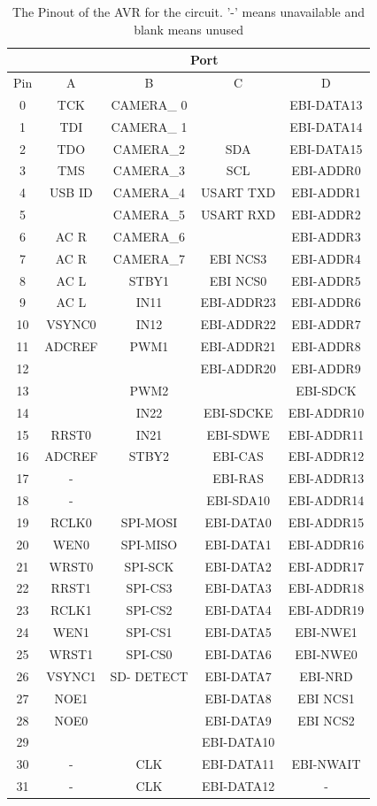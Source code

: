 \begin{table}
\caption{The Pinout of the AVR for the circuit. '-' means unavailable and blank means unused}
\label{table:UC3C:Pinout}
\begin{tabular}{|c|c|c|c|c|}\cline{2-5}
\multicolumn{1}{c|}{ } & \multicolumn{4}{|c|}{Port} \\ \hline
Pin & A & B & C & D \\ \hline
0&TCK&CAMERA\_ 0&&EBI-DATA13\\
1&TDI&CAMERA\_ 1&&EBI-DATA14\\
2&TDO&CAMERA\_2&SDA&EBI-DATA15\\
3&TMS&CAMERA\_3&SCL&EBI-ADDR0\\
4&USB ID&CAMERA\_4&USART TXD&EBI-ADDR1\\
5&&CAMERA\_5&USART RXD&EBI-ADDR2\\
6&AC R&CAMERA\_6&&EBI-ADDR3\\
7&AC R&CAMERA\_7&EBI NCS3&EBI-ADDR4\\
8&AC L&STBY1&EBI NCS0&EBI-ADDR5\\
9&AC L&IN11&EBI-ADDR23&EBI-ADDR6\\
10&VSYNC0&IN12&EBI-ADDR22&EBI-ADDR7\\
11&ADCREF&PWM1&EBI-ADDR21&EBI-ADDR8\\
12&&&EBI-ADDR20&EBI-ADDR9\\
13&&PWM2&&EBI-SDCK\\
14&&IN22&EBI-SDCKE&EBI-ADDR10\\
15&RRST0&IN21&EBI-SDWE&EBI-ADDR11\\
16&ADCREF&STBY2&EBI-CAS&EBI-ADDR12\\
17&-&&EBI-RAS&EBI-ADDR13\\
18&-&&EBI-SDA10&EBI-ADDR14\\
19&RCLK0&SPI-MOSI&EBI-DATA0&EBI-ADDR15\\
20&WEN0&SPI-MISO&EBI-DATA1&EBI-ADDR16\\
21&WRST0&SPI-SCK&EBI-DATA2&EBI-ADDR17\\
22&RRST1&SPI-CS3&EBI-DATA3&EBI-ADDR18\\
23&RCLK1&SPI-CS2&EBI-DATA4&EBI-ADDR19\\
24&WEN1&SPI-CS1&EBI-DATA5&EBI-NWE1\\
25&WRST1&SPI-CS0&EBI-DATA6&EBI-NWE0\\
26&VSYNC1&SD- DETECT&EBI-DATA7&EBI-NRD\\
27&NOE1&&EBI-DATA8&EBI NCS1\\
28&NOE0&&EBI-DATA9&EBI NCS2\\
29&&&EBI-DATA10&\\
30&-&CLK&EBI-DATA11&EBI-NWAIT\\
31&-&CLK&EBI-DATA12&-\\ \hline

\end{tabular}
\end{table}

